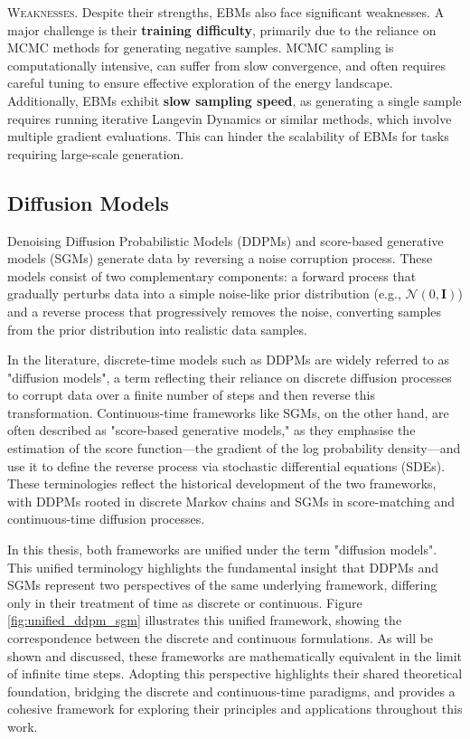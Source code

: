 \textsc{Weaknesses.} Despite their strengths, EBMs also face significant weaknesses. A major challenge is their \textbf{training difficulty}, primarily due to the reliance on MCMC methods for generating negative samples. MCMC sampling is computationally intensive, can suffer from slow convergence, and often requires careful tuning to ensure effective exploration of the energy landscape. Additionally, EBMs exhibit \textbf{slow sampling speed}, as generating a single sample requires running iterative Langevin Dynamics or similar methods, which involve multiple gradient evaluations. This can hinder the scalability of EBMs for tasks requiring large-scale generation.


\subsection{Diffusion Models}

Denoising Diffusion Probabilistic Models (DDPMs) \cite{ho2020denoising} and score-based generative models (SGMs) \cite{song2021sde} generate data by reversing a noise corruption process. These models consist of two complementary components: a forward process that gradually perturbs data into a simple noise-like prior distribution (e.g., \( \mathcal{N}(0, \mathbf{I}) \)) and a reverse process that progressively removes the noise, converting samples from the prior distribution into realistic data samples.

In the literature, discrete-time models such as DDPMs are widely referred to as "diffusion models", a term reflecting their reliance on discrete diffusion processes to corrupt data over a finite number of steps and then reverse this transformation. Continuous-time frameworks like SGMs, on the other hand, are often described as "score-based generative models," as they emphasise the estimation of the score function—the gradient of the log probability density—and use it to define the reverse process via stochastic differential equations (SDEs). These terminologies reflect the historical development of the two frameworks, with DDPMs rooted in discrete Markov chains and SGMs in score-matching and continuous-time diffusion processes.

In this thesis, both frameworks are unified under the term "diffusion models". This unified terminology highlights the fundamental insight that DDPMs and SGMs represent two perspectives of the same underlying framework, differing only in their treatment of time as discrete or continuous. Figure \ref{fig:unified_ddpm_sgm} illustrates this unified framework, showing the correspondence between the discrete and continuous formulations. As will be shown and discussed, these frameworks are mathematically equivalent in the limit of infinite time steps. Adopting this perspective highlights their shared theoretical foundation, bridging the discrete and continuous-time paradigms, and provides a cohesive framework for exploring their principles and applications throughout this work.

